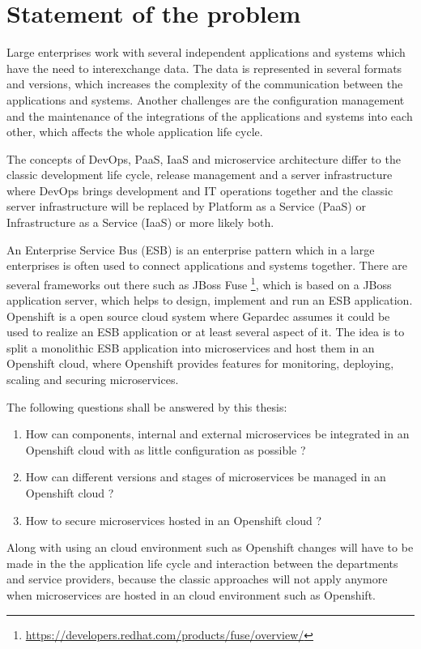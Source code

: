 \section{Statement of the problem}
\label{sec:statement-of-the-problem}
Large enterprises work with several independent applications and systems which have the need to interexchange data. The data is represented in several formats and versions, which increases the complexity of the communication between the applications and systems. Another challenges are the configuration management and the maintenance of the integrations of the applications and systems into each other, which affects the whole application life cycle.

The concepts of DevOps, PaaS, IaaS and microservice architecture differ to the classic development life cycle, release management and a server infrastructure where DevOps brings development and IT operations together and the classic server infrastructure will be replaced by Platform as a Service (PaaS) or Infrastructure as a Service (IaaS) or more likely both. 

An Enterprise Service Bus (ESB) is an enterprise pattern which in a large enterprises is often used to connect applications and systems together. There are several frameworks out there such as JBoss Fuse \footnote{\url{https://developers.redhat.com/products/fuse/overview/}}, which is based on a JBoss application server, which helps to design, implement and run an ESB application. Openshift is a open source cloud system where Gepardec assumes it could be used to realize an ESB application or at least several aspect of it. The idea is to split a monolithic ESB application into microservices and host them in an Openshift cloud, where Openshift provides features for monitoring, deploying, scaling and securing microservices.

The following questions shall be answered by this thesis:
\begin{enumerate}
	\item How can components, internal and external microservices be integrated in an Openshift cloud with as little configuration as possible ?
	\item How can different versions and stages of microservices be managed in an Openshift cloud ?
	\item How to secure microservices hosted in an Openshift cloud ?
\end{enumerate}
Along with using an cloud environment such as Openshift changes will have to be made in the the application life cycle and interaction between the departments and service providers, because the classic approaches will not apply anymore when microservices are hosted in an cloud environment such as Openshift.

